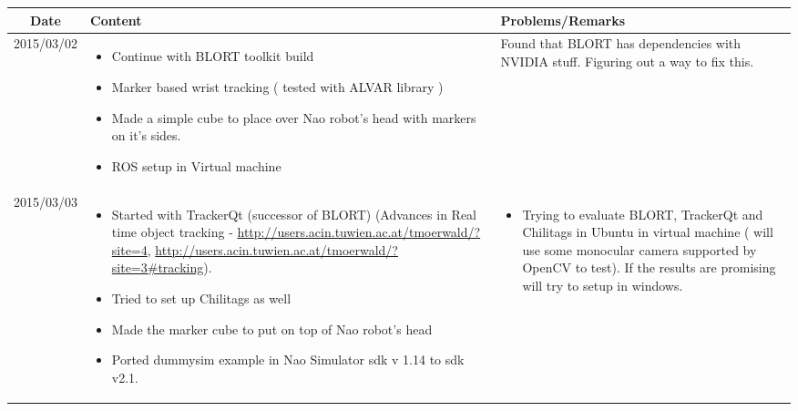 \documentclass[11pt]{article} %
\begin{document}
\begin{center}
    \begin{longtable}{ | c | p{6cm} | p{5cm} |}
    \hline
    Date & Content & Problems/Remarks \\ 
    \endhead
    \hline    
     2015/03/02         & 
  \begin{itemize}
  \item Continue with BLORT toolkit build
  \item Marker based wrist tracking ( tested with ALVAR library )
  \item Made a simple cube to place over Nao robot's head with markers on it's sides. 
  \item ROS setup in Virtual machine
\end{itemize}  
   & Found that BLORT has dependencies with NVIDIA stuff. Figuring out a way to fix this. \\
\hline
  										 
 2015/03/03         & 
  \begin{itemize}
  \item Started with TrackerQt (successor of BLORT) (Advances in Real time object tracking - \url{http://users.acin.tuwien.ac.at/tmoerwald/?site=4}, \url{http://users.acin.tuwien.ac.at/tmoerwald/?site=3#tracking}). 
  \item Tried to set up Chilitags as well
  \item Made the marker cube to put on top of Nao robot's head
  \item Ported dummysim example in Nao Simulator sdk v 1.14 to sdk v2.1.
%           
\end{itemize}   
& 
  \begin{itemize}
  \item Trying to evaluate BLORT, TrackerQt and Chilitags in Ubuntu in virtual machine ( will use some monocular camera supported by OpenCV to test). If the results are promising will try to setup in windows.
\end{itemize}  \\
\hline
  										 

\end{longtable}
\end{center}
\end{document}
